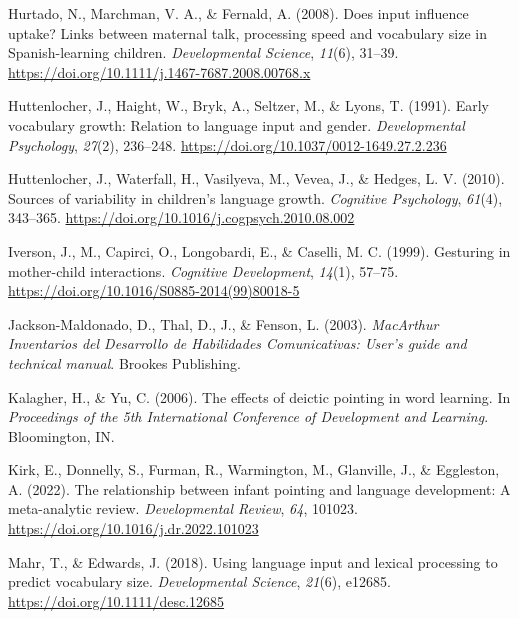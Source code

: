 \documentclass[
  english,
  man,mask]{apa6}
\begin{document}
\leavevmode\hypertarget{ref-hurtado_does_2008}{}%
Hurtado, N., Marchman, V. A., \& Fernald, A. (2008). Does input influence uptake? Links between maternal talk, processing speed and vocabulary size in Spanish-learning children. \emph{Developmental Science}, \emph{11}(6), 31--39. \url{https://doi.org/10.1111/j.1467-7687.2008.00768.x}

\leavevmode\hypertarget{ref-huttenlocher_early_1991}{}%
Huttenlocher, J., Haight, W., Bryk, A., Seltzer, M., \& Lyons, T. (1991). Early vocabulary growth: Relation to language input and gender. \emph{Developmental Psychology}, \emph{27}(2), 236--248. \url{https://doi.org/10.1037/0012-1649.27.2.236}

\leavevmode\hypertarget{ref-huttenlocher_sources_2010}{}%
Huttenlocher, J., Waterfall, H., Vasilyeva, M., Vevea, J., \& Hedges, L. V. (2010). Sources of variability in children's language growth. \emph{Cognitive Psychology}, \emph{61}(4), 343--365. \url{https://doi.org/10.1016/j.cogpsych.2010.08.002}

\leavevmode\hypertarget{ref-iverson_gesturing_1999}{}%
Iverson, J., M., Capirci, O., Longobardi, E., \& Caselli, M. C. (1999). Gesturing in mother-child interactions. \emph{Cognitive Development}, \emph{14}(1), 57--75. \url{https://doi.org/10.1016/S0885-2014(99)80018-5}

\leavevmode\hypertarget{ref-jackson-maldonado_macarthur_2003}{}%
Jackson-Maldonado, D., Thal, D., J., \& Fenson, L. (2003). \emph{MacArthur Inventarios del Desarrollo de Habilidades Comunicativas: User's guide and technical manual}. Brookes Publishing.

\leavevmode\hypertarget{ref-kalagher_effects_2006}{}%
Kalagher, H., \& Yu, C. (2006). The effects of deictic pointing in word learning. In \emph{Proceedings of the 5th International Conference of Development and Learning}. Bloomington, IN.

\leavevmode\hypertarget{ref-kirk_relationship_2022}{}%
Kirk, E., Donnelly, S., Furman, R., Warmington, M., Glanville, J., \& Eggleston, A. (2022). The relationship between infant pointing and language development: A meta-analytic review. \emph{Developmental Review}, \emph{64}, 101023. \url{https://doi.org/10.1016/j.dr.2022.101023}

\leavevmode\hypertarget{ref-mahr_using_2018}{}%
Mahr, T., \& Edwards, J. (2018). Using language input and lexical processing to predict vocabulary size. \emph{Developmental Science}, \emph{21}(6), e12685. \url{https://doi.org/10.1111/desc.12685}
\end{document}
